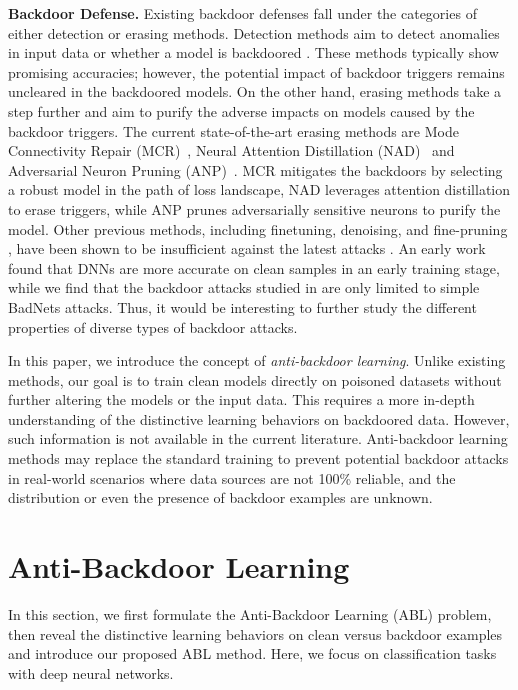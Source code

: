 \noindent\textbf{Backdoor Defense.} Existing backdoor defenses fall under the categories of either detection or erasing methods. Detection methods aim to detect anomalies in input data \cite{chen2018detecting,tran2018spectral,gao2019strip,xu2019detecting,hayase2021spectre,tang2021demon} or whether a model is backdoored \cite{wang2019neural,chen2019deepinspect,kolouri2020universal,shen2021backdoor}. These methods typically show promising accuracies; however, the potential impact of backdoor triggers remains uncleared in the backdoored models. On the other hand, erasing methods take a step further and aim to purify the adverse impacts on models caused by the backdoor triggers. The current state-of-the-art erasing methods are Mode Connectivity Repair (MCR)~\cite{zhao2020bridging}, Neural Attention Distillation (NAD)~\cite{li2021neural} and Adversarial Neuron Pruning (ANP)~\cite{wu2021adversarial}. MCR mitigates the backdoors by selecting a robust model in the path of loss landscape, NAD leverages attention distillation to erase triggers, while ANP prunes adversarially sensitive neurons to purify the model. Other previous methods, including finetuning, denoising, and fine-pruning \cite{liu2018fine}, have been shown to be insufficient against the latest attacks \cite{yao2019latent,li2020rethinking,liu2020reflection}. An early work \cite{shen2019learning} found that DNNs are more accurate on clean samples in an early training stage, while we find that the backdoor attacks studied in \cite{shen2019learning} are only limited to simple BadNets attacks. Thus, it would be interesting to further study the different properties of diverse types of backdoor attacks.

In this paper, we introduce the concept of \emph{anti-backdoor learning}. Unlike existing methods, our goal is to train clean models directly on poisoned datasets without further altering the models or the input data. This requires a more in-depth understanding of the distinctive learning behaviors on backdoored data. However, such information is not available in the current literature. Anti-backdoor learning methods may replace the standard training to prevent potential backdoor attacks in real-world scenarios where data sources are not 100\% reliable, and the distribution or even the presence of backdoor examples are unknown.

\section{Anti-Backdoor Learning} \label{sec:3}
In this section, we first formulate the Anti-Backdoor Learning (ABL) problem, then reveal the distinctive learning behaviors on clean versus backdoor examples and introduce our proposed ABL method. Here, we focus on classification tasks with deep neural networks.

